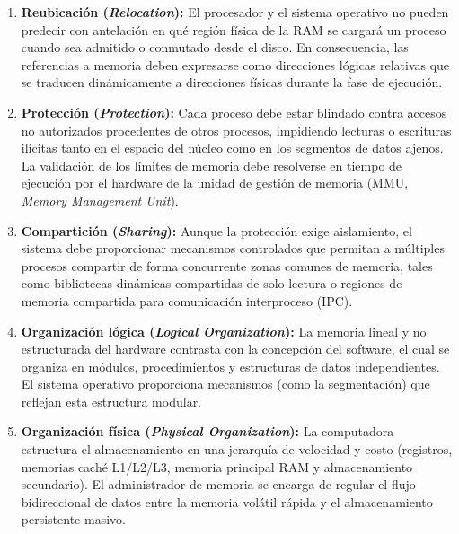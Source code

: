 \documentclass[12pt]{article}
\begin{document}
\begin{enumerate}[leftmargin=*]
    \item \textbf{Reubicación (\textit{Relocation}):} El procesador y el sistema operativo no pueden predecir con antelación en qué región física de la RAM se cargará un proceso cuando sea admitido o conmutado desde el disco. En consecuencia, las referencias a memoria deben expresarse como direcciones lógicas relativas que se traducen dinámicamente a direcciones físicas durante la fase de ejecución.
    \item \textbf{Protección (\textit{Protection}):} Cada proceso debe estar blindado contra accesos no autorizados procedentes de otros procesos, impidiendo lecturas o escrituras ilícitas tanto en el espacio del núcleo como en los segmentos de datos ajenos. La validación de los límites de memoria debe resolverse en tiempo de ejecución por el hardware de la unidad de gestión de memoria (MMU, \textit{Memory Management Unit}).
    \item \textbf{Compartición (\textit{Sharing}):} Aunque la protección exige aislamiento, el sistema debe proporcionar mecanismos controlados que permitan a múltiples procesos compartir de forma concurrente zonas comunes de memoria, tales como bibliotecas dinámicas compartidas de solo lectura o regiones de memoria compartida para comunicación interproceso (IPC).
    \item \textbf{Organización lógica (\textit{Logical Organization}):} La memoria lineal y no estructurada del hardware contrasta con la concepción del software, el cual se organiza en módulos, procedimientos y estructuras de datos independientes. El sistema operativo proporciona mecanismos (como la segmentación) que reflejan esta estructura modular.
    \item \textbf{Organización física (\textit{Physical Organization}):} La computadora estructura el almacenamiento en una jerarquía de velocidad y costo (registros, memorias caché L1/L2/L3, memoria principal RAM y almacenamiento secundario). El administrador de memoria se encarga de regular el flujo bidireccional de datos entre la memoria volátil rápida y el almacenamiento persistente masivo.
\end{enumerate}
\end{document}
